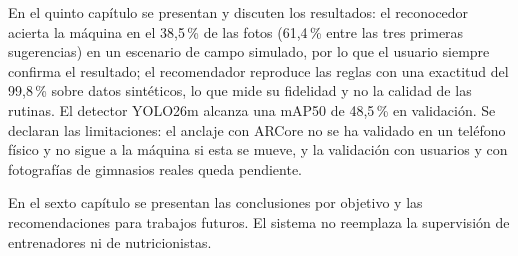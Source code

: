 En el quinto capítulo se presentan y discuten los resultados: el reconocedor
acierta la máquina en el 38,5\,\% de las fotos (61,4\,\% entre las tres primeras
sugerencias) en un escenario de campo simulado, por lo que el usuario siempre
confirma el resultado; el recomendador reproduce las reglas con una exactitud
del 99,8\,\% sobre datos sintéticos, lo que mide su fidelidad y no la calidad de
las rutinas. El detector YOLO26m alcanza una mAP50 de 48,5\,\% en validación. Se
declaran las limitaciones: el anclaje con ARCore no se ha validado en un
teléfono físico y no sigue a la máquina si esta se mueve, y la validación con
usuarios y con fotografías de gimnasios reales queda pendiente.

En el sexto capítulo se presentan las conclusiones por objetivo y las
recomendaciones para trabajos futuros. El sistema no reemplaza la supervisión
de entrenadores ni de nutricionistas.
\normalsize
